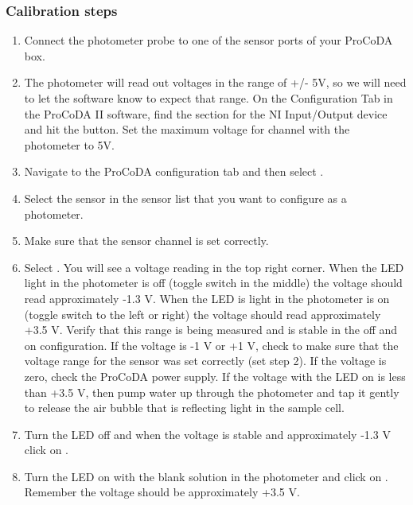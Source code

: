 \documentclass[letterpaper,10pt,english]{sphinxmanual}
\begin{document}
\subsubsection{Calibration steps}
\label{\detokenize{ProCoDA/ProCoDA:calibration-steps}}\begin{enumerate}
\item {} 
Connect the photometer probe to one of the sensor ports of your ProCoDA box.

\item {} 
The photometer will read out voltages in the range of +/- 5V, so we will need to let the software know to expect that range. On the Configuration Tab in the ProCoDA II software, find the section for the NI Input/Output device and hit the  button. Set the maximum voltage for channel with the photometer to 5V.

\item {} 
Navigate to the ProCoDA configuration tab and then select .

\item {} 
Select the sensor in the sensor list that you want to configure as a photometer.

\item {} 
Make sure that the sensor channel is set correctly.

\item {} 
Select . You will see a voltage reading in the top right corner. When the LED light in the photometer is off (toggle switch in the middle) the voltage should read approximately -1.3 V. When the LED is light in the photometer is on (toggle switch to the left or right) the voltage should read approximately +3.5 V. Verify that this range is being measured and is stable in the off and on configuration. If the voltage is -1 V or +1 V, check to make sure that the voltage range for the sensor was set correctly (set step 2). If the voltage is zero, check the ProCoDA power supply. If the voltage with the LED on is less than +3.5 V, then pump water up through the photometer and tap it gently to release the air bubble that is reflecting light in the sample cell.

\item {} 
Turn the LED off and when the voltage is stable and approximately -1.3 V click on .

\item {} 
Turn the LED on with the blank solution in the photometer and click on . Remember the voltage should be approximately +3.5 V.

\end{enumerate}
\end{document}
